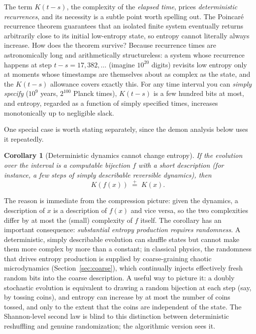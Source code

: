 \documentclass[10pt]{article}
\newtheorem{corollary}[theorem]{Corollary}
\theoremstyle{definition}
\theoremstyle{remark}
\newcommand{\peq}{\mathrel{\stackrel{+}{=}}}
\begin{document}
The term $K(t-s)$, the complexity of the \emph{elapsed time}, prices \emph{deterministic recurrences}, and its necessity is a subtle point worth spelling out. The Poincar\'e recurrence theorem guarantees that an isolated finite system eventually returns arbitrarily close to its initial low-entropy state, so entropy cannot literally always increase. How does the theorem survive? Because recurrence times are astronomically long and arithmetically structureless: a system whose recurrence happens at step $t - s = 17{,}382{,}\dots$ (imagine $10^{20}$ digits) revisits low entropy only at moments whose timestamps are themselves about as complex as the state, and the $K(t-s)$ allowance covers exactly this. For any time interval you can \emph{simply specify} ($10^9$ years, $2^{100}$ Planck times), $K(t-s)$ is a few hundred bits at most, and entropy, regarded as a function of simply specified times, increases monotonically up to negligible slack.

One special case is worth stating separately, since the demon analysis below uses it repeatedly.

\begin{corollary}[Deterministic dynamics cannot change entropy]
\label{cor:deterministic}
If the evolution over the interval is a computable bijection $f$ with a short description (for instance, a few steps of simply describable reversible dynamics), then
\[
K(f(x)) \;\peq\; K(x).
\]
\end{corollary}

The reason is immediate from the compression picture: given the dynamics, a description of $x$ is a description of $f(x)$ and vice versa, so the two complexities differ by at most the (small) complexity of $f$ itself. The corollary has an important consequence: \emph{substantial entropy production requires randomness}. A deterministic, simply describable evolution can shuffle states but cannot make them more complex by more than a constant; in classical physics, the randomness that drives entropy production is supplied by coarse-graining chaotic microdynamics (Section~\ref{sec:coarse}), which continually injects effectively fresh random bits into the coarse description. A useful way to picture it: a doubly stochastic evolution is equivalent to drawing a random bijection at each step (say, by tossing coins), and entropy can increase by at most the number of coins tossed, and only to the extent that the coins are independent of the state. The Shannon-level second law is blind to this distinction between deterministic reshuffling and genuine randomization; the algorithmic version sees it.
\end{document}
